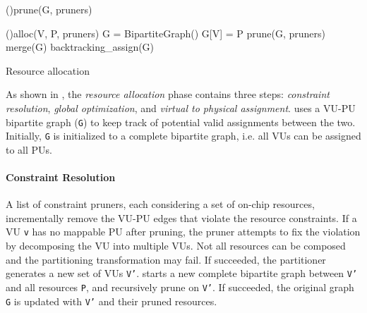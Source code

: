 \begin{algorithm}
  \Fn(){prune(G, pruners)}{

  }
  \vspace{0.5cm}
  \Fn(){alloc(V, P, pruners)}{
    G = \KwNew BipartiteGraph()\;
    G[V] = P\;
    prune(G, pruners)\;
    merge(G)\;
    backtracking\_assign(G)\;
  }
  \caption{Resource allocation}
  \label{algo:resalloc}
\end{algorithm}
 
As shown in , the \emph{resource allocation} phase contains three steps:
\emph{constraint resolution}, \emph{global optimization}, and \emph{virtual to physical assignment}.
\name uses a VU-PU bipartite graph (\texttt{G}) to keep track of potential valid assignments between the two.
Initially, \texttt{G} is initialized to a complete bipartite graph, i.e. all VUs can be assigned to
all PUs.

\paragraph{Constraint Resolution}
A list of constraint pruners, each considering a set of on-chip resources, 
incrementally remove the VU-PU edges that violate the resource constraints.
If a VU \texttt{v} has no mappable PU after pruning, the pruner attempts to fix the violation by
decomposing the VU into multiple VUs. 
Not all resources can be composed and the partitioning transformation may fail.
If succeeded, the partitioner generates a new set of VUs \texttt{V'}. \name starts a new complete bipartite
graph between \texttt{V'} and all resources \texttt{P}, and recursively prune on \texttt{V'}.
If succeeded, the original graph \texttt{G} is updated with \texttt{V'} and their pruned resources.

